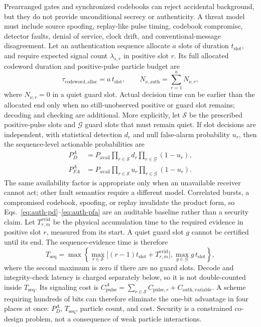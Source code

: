 \documentclass[11pt]{article}
\begin{document}
Prearranged gates and synchronized codebooks can reject accidental background, but they do not provide unconditional secrecy or authenticity. A threat model must include source spoofing, replay-like pulse timing, codebook compromise, detector faults, denial of service, clock drift, and conventional-message disagreement. Let an authentication sequence allocate $a$ slots of duration $t_{\mathrm{slot}}$, and require expected signal count $\lambda_{s,r}$ in positive slot $r$. Its full allocated codeword duration and positive-pulse particle budget are
\begin{equation}
\tau_{\mathrm{codeword,alloc}}=a\,t_{\mathrm{slot}},\qquad
N_{\nu,\mathrm{auth}}=\sum_{r=1}^{a}N_{\nu,r},
\end{equation}
where $N_{\nu,r}=0$ in a quiet guard slot. Actual decision time can be earlier than the allocated end only when no still-unobserved positive or guard slot remains; decoding and checking are additional. More explicitly, let $\mathcal S$ be the prescribed positive-pulse slots and $\mathcal G$ guard slots that must remain quiet. If slot decisions are independent, with statistical detection $d_r$ and null false-alarm probability $u_r$, then the sequence-level actionable probabilities are
\begin{align}
P_D^{A}&=P_{\mathrm{avail}}\prod_{r\in\mathcal S}d_r
                 \prod_{r\in\mathcal G}(1-u_r),\label{eq:auth-pd}\\
P_{FA}^{A}&=P_{\mathrm{avail}}\prod_{r\in\mathcal S}u_r
                 \prod_{r\in\mathcal G}(1-u_r).\label{eq:auth-pfa}
\end{align}
The same availability factor is appropriate only when an unavailable receiver cannot act; other fault semantics require a different model. Correlated bursts, a compromised codebook, spoofing, or replay invalidate the product form, so Eqs.~\eqref{eq:auth-pd}--\eqref{eq:auth-pfa} are an auditable baseline rather than a security claim. Let $T_{r,m}^{\mathrm{evid}}$ be the physical accumulation time to the required evidence in positive slot $r$, measured from its start. A quiet guard slot $g$ cannot be certified until its end. The sequence-evidence time is therefore
\begin{equation}
T_{\mathrm{seq}}=\max\!\left\{
\max_{r\in\mathcal S}\bigl[(r-1)t_{\mathrm{slot}}+T_{r,m}^{\mathrm{evid}}\bigr],
\max_{g\in\mathcal G}g\,t_{\mathrm{slot}}
\right\},
\label{eq:sequence-time}
\end{equation}
where the second maximum is zero if there are no guard slots. Decode and integrity-check latency is charged separately below, so it is not double-counted inside $T_{\mathrm{seq}}$. Its signaling cost is $C_{\mathrm{pulse}}^{A}=\sum_{r\in\mathcal S}C_{\mathrm{pulse},r}+C_{\mathrm{auth,variable}}$. A scheme requiring hundreds of bits can therefore eliminate the one-bit advantage in four places at once: $P_D^{A}$, $T_{\mathrm{seq}}$, particle count, and cost. Security is a constrained co-design problem, not a consequence of weak particle interactions.
\end{document}

